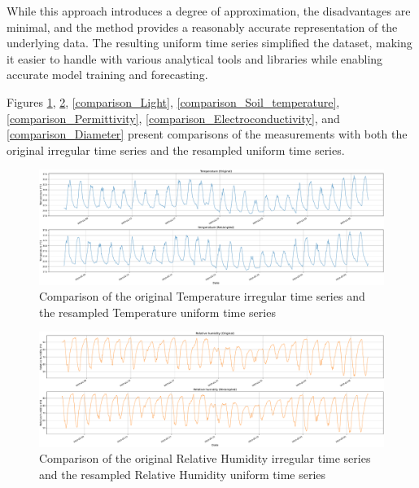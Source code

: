 While this approach introduces a degree of approximation, the disadvantages are minimal, and the method provides a reasonably accurate representation of the underlying data. The resulting uniform time series simplified the dataset, making it easier to handle with various analytical tools and libraries while enabling accurate model training and forecasting.

Figures \ref{comparison_Temperature}, \ref{comparison_Relative_humidity}, \ref{comparison_Light}, \ref{comparison_Soil_temperature}, \ref{comparison_Permittivity}, \ref{comparison_Electroconductivity}, and \ref{comparison_Diameter} present comparisons of the measurements with both the original irregular time series and the resampled uniform time series.


\begin{figure}[htbp]
    \centering
    \includegraphics[width=15 cm]{5_ChapterDesign/figuras/5_Irregular/comparison_Temperature.pdf}
    \caption{Comparison of the original Temperature irregular time series and the resampled Temperature uniform time series}
    \label{comparison_Temperature}
\end{figure}

\begin{figure}[htbp]
    \centering
    \includegraphics[width=15 cm]{5_ChapterDesign/figuras/5_Irregular/comparison_Relative_humidity.pdf}
    \caption{Comparison of the original Relative Humidity irregular time series and the resampled Relative Humidity uniform time series}
    \label{comparison_Relative_humidity}
\end{figure}

